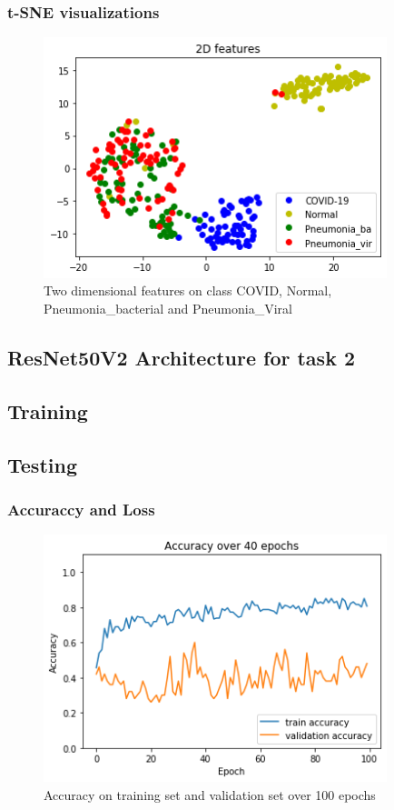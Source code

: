 \documentclass[a4paper,12pt]{article}
\begin{document}
\subsubsection{t-SNE visualizations}
\begin{figure}[H]
  \centering
  \includegraphics[width=10cm]{./images/task2-tsen.png}
     \caption{Two dimensional features on class COVID, Normal, Pneumonia\_bacterial and Pneumonia\_Viral}
        \label{task2-tsen}
\end{figure}

\subsection{ResNet50V2 Architecture for task 2}

\subsection{Training}
\subsection{Testing}

\subsubsection{Accuraccy and Loss}
\begin{figure}[H]
  \centering
  \includegraphics[width=10cm]{./images/ResNet50V2-accuracy.png}
     \caption{Accuracy on training set and validation set over 100 epochs}
        \label{task2-loss}
\end{figure}
\end{document}
